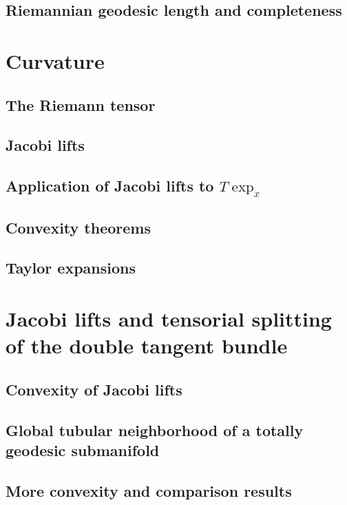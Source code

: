 \documentclass[a4paper]{article}
\begin{document}
\subsection{Riemannian geodesic length and completeness}

\section{Curvature}

\subsection{The Riemann tensor}

\subsection{Jacobi lifts}

\subsection{Application of Jacobi lifts to $T\exp_x$}

\subsection{Convexity theorems}

\subsection{Taylor expansions}

\section{Jacobi lifts and tensorial splitting of the double tangent bundle}

\subsection{Convexity of Jacobi lifts}

\subsection{Global tubular neighborhood of a totally geodesic submanifold}

\subsection{More convexity and comparison results}
\end{document}
